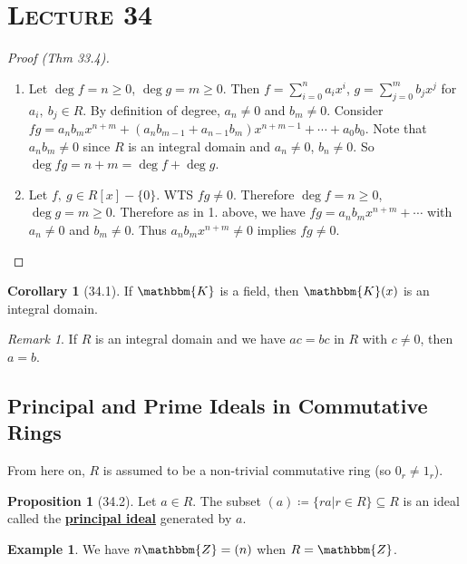\documentclass{article}
\newcommand{\Z}{\mathbbm{Z}}
\newcommand{\coleq}{\coloneqq}
\newcommand{\define}[1]{\textbf{\underline{#1}}}
\renewcommand{\Subset}{\subseteq}
\theoremstyle{definition}
\newtheorem*{cor}{Corollary}
\newtheorem*{prop}{Proposition}
\newtheorem*{ex}{Example}
\theoremstyle{remark}
\newtheorem*{rmk}{Remark}
\newcommand{\K}{\mathbbm{K}}
\begin{document}
    \section*{\textbf{\textsc{Lecture 34}}}{
        \begin{proof}[Proof (Thm 33.4)]
            \begin{enumerate}
                \item Let $\deg f=n\geq0$, $\deg g=m \geq 0$. Then $f=\sum_{i=0}^n a_ix^i$, $g=\sum_{j=0}^m b_jx^j$ for $a_i, \ b_j \in R$. By definition of degree, $a_n\neq 0$ and $b_m \neq 0$. Consider $fg=a_nb_mx^{n+m}+(a_nb_{m-1}+a_{n-1}b_m)x^{n+m-1}+\cdots+a_0b_0$. Note that $a_nb_m\neq 0$ since $R$ is an integral domain and $a_n\neq 0$, $b_n\neq 0$. So $\deg fg=n+m=\deg f+\deg g$.
                \item Let $f, \ g\in R[x]-\{0\}$. WTS $fg\neq 0$. Therefore $\deg f=n \geq 0$, $\deg g=m \geq 0$. Therefore as in 1. above, we have $fg=a_nb_mx^{n+m}+\cdots$ with $a_n \neq 0$ and $b_m \neq 0$. Thus $a_nb_mx^{n+m}\neq 0$ implies $fg\neq 0$.
            \end{enumerate}
        \end{proof}
        
        \begin{cor}[34.1]
            If $\K$ is a field, then $\K(x)$ is an integral domain.
        \end{cor}
        
        \begin{rmk}
            If $R$ is an integral domain and we have $ac=bc$ in $R$ with $c\neq 0$, then $a=b$.
        \end{rmk}
        
        \subsection*{Principal and Prime Ideals in Commutative Rings}{
            From here on, $R$ is assumed to be a non-trivial commutative ring (so $0_r\neq 1_r$).
            
            \begin{prop}[34.2]
                Let $a \in R$. The subset $(a)\coleq\{ra|r\in R\}\Subset R$ is an ideal called the \define{principal ideal} generated by $a$.
            \end{prop}
            
            \begin{ex}
                We have $n\Z=(n)$ when $R=\Z$.
            \end{ex}
            
}}
\end{document}
